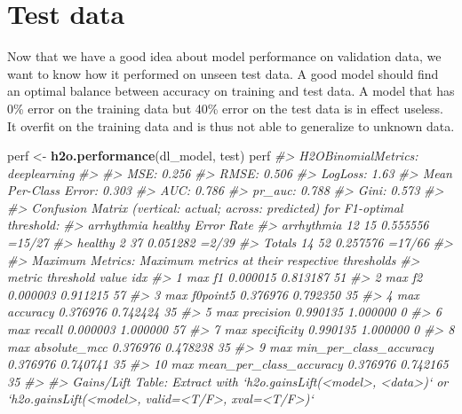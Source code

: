 \documentclass[]{book}
\newenvironment{Shaded}{\begin{snugshade}}{\end{snugshade}}
\newcommand{\CommentTok}[1]{\textcolor[rgb]{0.56,0.35,0.01}{\textit{#1}}}
\newcommand{\KeywordTok}[1]{\textcolor[rgb]{0.13,0.29,0.53}{\textbf{#1}}}
\newcommand{\NormalTok}[1]{#1}
\newcommand{\StringTok}[1]{\textcolor[rgb]{0.31,0.60,0.02}{#1}}
\begin{document}
\hypertarget{test-data}{%
\section{Test data}\label{test-data}}

Now that we have a good idea about model performance on validation data, we want to know how it performed on unseen test data. A good model should find an optimal balance between accuracy on training and test data. A model that has 0\% error on the training data but 40\% error on the test data is in effect useless. It overfit on the training data and is thus not able to generalize to unknown data.

\begin{Shaded}
\begin{Highlighting}[]
\NormalTok{perf <-}\StringTok{ }\KeywordTok{h2o.performance}\NormalTok{(dl_model, test)}
\NormalTok{perf}
\CommentTok{#> H2OBinomialMetrics: deeplearning}
\CommentTok{#> }
\CommentTok{#> MSE:  0.256}
\CommentTok{#> RMSE:  0.506}
\CommentTok{#> LogLoss:  1.63}
\CommentTok{#> Mean Per-Class Error:  0.303}
\CommentTok{#> AUC:  0.786}
\CommentTok{#> pr_auc:  0.788}
\CommentTok{#> Gini:  0.573}
\CommentTok{#> }
\CommentTok{#> Confusion Matrix (vertical: actual; across: predicted) for F1-optimal threshold:}
\CommentTok{#>            arrhythmia healthy    Error    Rate}
\CommentTok{#> arrhythmia         12      15 0.555556  =15/27}
\CommentTok{#> healthy             2      37 0.051282   =2/39}
\CommentTok{#> Totals             14      52 0.257576  =17/66}
\CommentTok{#> }
\CommentTok{#> Maximum Metrics: Maximum metrics at their respective thresholds}
\CommentTok{#>                         metric threshold    value idx}
\CommentTok{#> 1                       max f1  0.000015 0.813187  51}
\CommentTok{#> 2                       max f2  0.000003 0.911215  57}
\CommentTok{#> 3                 max f0point5  0.376976 0.792350  35}
\CommentTok{#> 4                 max accuracy  0.376976 0.742424  35}
\CommentTok{#> 5                max precision  0.990135 1.000000   0}
\CommentTok{#> 6                   max recall  0.000003 1.000000  57}
\CommentTok{#> 7              max specificity  0.990135 1.000000   0}
\CommentTok{#> 8             max absolute_mcc  0.376976 0.478238  35}
\CommentTok{#> 9   max min_per_class_accuracy  0.376976 0.740741  35}
\CommentTok{#> 10 max mean_per_class_accuracy  0.376976 0.742165  35}
\CommentTok{#> }
\CommentTok{#> Gains/Lift Table: Extract with `h2o.gainsLift(<model>, <data>)` or `h2o.gainsLift(<model>, valid=<T/F>, xval=<T/F>)`}
\end{Highlighting}
\end{Shaded}
\end{document}
